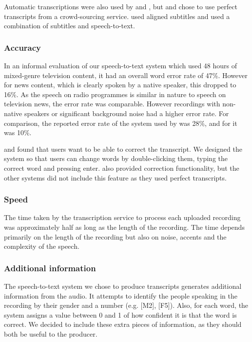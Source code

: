 Automatic transcriptions were also used by \citet{Whittaker2004} and
\citet{Sivaraman2016}, but \citet{Berthouzoz2012} and \citet{Rubin2013} chose
to use perfect transcripts from a crowd-sourcing service. \citet{Hyperaudio2016}
used aligned subtitles and \citet{Casares2002} used a combination of subtitles
and speech-to-text.

\subsubsection{Accuracy}\label{sec:transcript}
In an informal evaluation of our speech-to-text system which used 48 hours of
mixed-genre television content, it had an overall word error rate of 47\%.
However for news content, which is clearly spoken by a native speaker, this
dropped to 16\%. As the speech on radio programmes is similar in nature to
speech on television news, the error rate was comparable. However recordings
with non-native speakers or significant background noise had a higher error
rate. For comparison, the reported error rate of the system used by
\citet{Whittaker2004} was 28\%, and for \citet{Sivaraman2016} it was 10\%.

\citet{Whittaker2004} and \citet{Sivaraman2016} found that users want to be
able to correct the transcript. We designed the system so that users can change
words by double-clicking them, typing the correct word and pressing enter.
\citet{Casares2002} also provided correction functionality, but the other
systems did not include this feature as they used perfect transcripts.

\subsubsection{Speed}
The time taken by the transcription service to process each uploaded recording
was approximately half as long as the length of the recording. The time
depends primarily on the length of the recording but also on noise, accents and
the complexity of the speech.

\subsubsection{Additional information}
The speech-to-text system we chose to produce transcripts generates
additional information from the audio. It attempts to identify the people
speaking in the recording by their gender and a number (e.g. [M2], [F5]). Also,
for each word, the system assigns a value between 0 and 1 of how confident it
is that the word is correct. We decided to include these extra pieces of
information, as they should both be useful to the producer.

